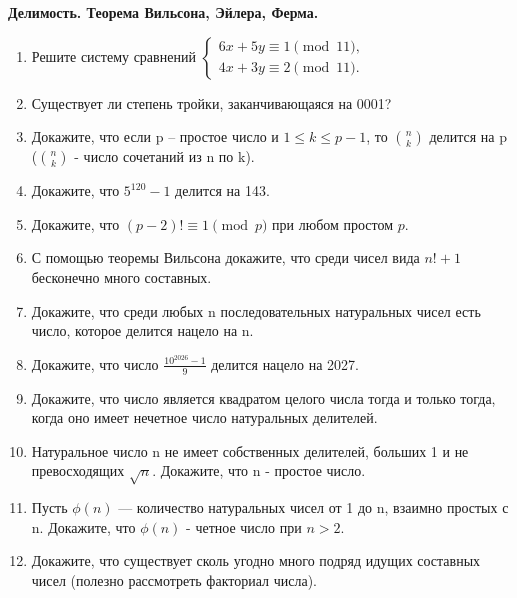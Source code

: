 \documentclass[a4paper,12pt]{article}
\begin{document}
\begin{center}
    {\Large \textbf{Делимость. Теорема Вильсона, Эйлера, Ферма.}}\\[0.5em]
\end{center}
 
\begin{enumerate}[label=\textbf{Задача \arabic*.}]
\item Решите систему сравнений $\begin{cases} 6x + 5y \equiv 1 \pmod{11}, \\ 4x + 3y \equiv 2 \pmod{11}. \end{cases}$
\item Существует ли степень тройки, заканчивающаяся на 0001? 
\item Докажите, что если p – простое число и  $1 \leq k \leq p - 1$,  то $\binom{n}{k}$ делится на p ($\binom{n}{k}$ - число сочетаний из n по k). 
\item Докажите, что  $5^{120} - 1$  делится на 143.
\item Докажите, что $(p - 2)! \equiv 1 \pmod{p}$ при любом простом $p$.
\item С помощью теоремы Вильсона докажите, что среди чисел вида $n! + 1$ бесконечно много составных.
\item Докажите, что среди любых n последовательных натуральных чисел есть число, которое делится нацело на n.
\item Докажите, что число $\frac{10^{2026} - 1}{9}$  делится нацело на 2027.
\item Докажите, что число является квадратом целого числа тогда и только тогда, когда оно имеет нечетное число натуральных делителей.
\item Натуральное число n не имеет собственных делителей, больших 1 и не превосходящих $\sqrt{n}$. Докажите, что n - простое число.
\item Пусть $\phi(n)$ — количество натуральных чисел от 1 до n, взаимно простых с n. Докажите, что $\phi(n)$ - четное число при $n > 2$.
\item Докажите, что существует сколь угодно много подряд идущих составных чисел (полезно рассмотреть факториал числа).
\end{enumerate}
\end{document}
